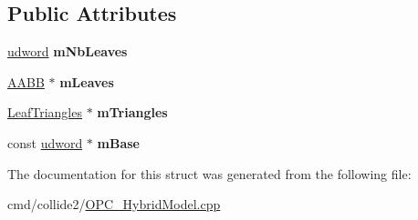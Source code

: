 \subsection*{Public Attributes}
\begin{DoxyCompactItemize}
\item 
\hyperlink{IceTypes_8h_a44c6f1920ba5551225fb534f9d1a1733}{udword} {\bfseries m\+Nb\+Leaves}\hypertarget{structOpcode_1_1Internal_a48002edabc583023c44555e7dbc4bb62}{}\label{structOpcode_1_1Internal_a48002edabc583023c44555e7dbc4bb62}

\item 
\hyperlink{classOpcode_1_1AABB}{A\+A\+BB} $\ast$ {\bfseries m\+Leaves}\hypertarget{structOpcode_1_1Internal_a1281ecdd60d495a563f58b557ae506a3}{}\label{structOpcode_1_1Internal_a1281ecdd60d495a563f58b557ae506a3}

\item 
\hyperlink{structOpcode_1_1LeafTriangles}{Leaf\+Triangles} $\ast$ {\bfseries m\+Triangles}\hypertarget{structOpcode_1_1Internal_a5e1020a358ea20fda2c34b0d12148a54}{}\label{structOpcode_1_1Internal_a5e1020a358ea20fda2c34b0d12148a54}

\item 
const \hyperlink{IceTypes_8h_a44c6f1920ba5551225fb534f9d1a1733}{udword} $\ast$ {\bfseries m\+Base}\hypertarget{structOpcode_1_1Internal_a13e66fd3e2aeb77a5d33bd6ac7182f3b}{}\label{structOpcode_1_1Internal_a13e66fd3e2aeb77a5d33bd6ac7182f3b}

\end{DoxyCompactItemize}


The documentation for this struct was generated from the following file\+:\begin{DoxyCompactItemize}
\item 
cmd/collide2/\hyperlink{OPC__HybridModel_8cpp}{O\+P\+C\+\_\+\+Hybrid\+Model.\+cpp}\end{DoxyCompactItemize}
